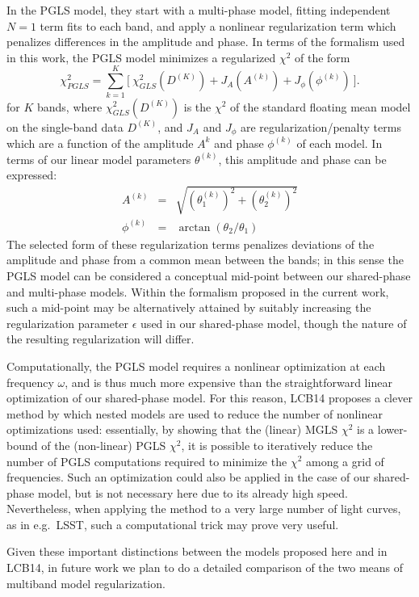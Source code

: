 \documentclass{emulateapj}
\begin{document}
In the PGLS model, they start with a multi-phase model, fitting independent $N=1$ term fits to each band, and apply a nonlinear regularization term which penalizes differences in the amplitude and phase. In terms of the formalism used in this work, the PGLS model minimizes a regularized $\chi^2$ of the form
\begin{equation}
  \chi^2_{PGLS} = \sum_{k=1}^K \bigg[~\chi^2_{GLS}(D^{(K)}) + J_A(A^{(k)}) + J_\phi(\phi^{(k)})~\bigg].
\end{equation}
for $K$ bands, where $\chi^2_{GLS}(D^{(K)})$ is the $\chi^2$ of the standard floating mean model on the single-band data $D^{(K)}$, and $J_A$ and $J_\phi$ are regularization/penalty terms which are a function of the amplitude $A^{k}$ and phase $\phi^{(k)}$ of each model. In terms of our linear model parameters $\theta^{(k)}$, this amplitude and phase can be expressed:
\begin{eqnarray}
 A^{(k)} &=& \sqrt{(\theta_1^{(k)})^2 + (\theta_2^{(k)})^2}\nonumber\\
 \phi^{(k)} &=& \arctan(\theta_2 / \theta_1)
\end{eqnarray}
The selected form of these regularization terms penalizes deviations of the amplitude and phase from a common mean between the bands; in this sense the PGLS model can be considered a conceptual mid-point between our shared-phase and multi-phase models.
Within the formalism proposed in the current work, such a mid-point may be alternatively attained by suitably increasing the regularization parameter $\epsilon$ used in our shared-phase model, though the nature of the resulting regularization will differ.

Computationally, the PGLS model requires a nonlinear optimization at each frequency $\omega$, and is thus much more expensive than the straightforward linear optimization of our shared-phase model.
For this reason, LCB14 proposes a clever method by which nested models are used to reduce the number of nonlinear optimizations used: essentially, by showing that the (linear) MGLS $\chi^2$ is a lower-bound of the (non-linear) PGLS $\chi^2$, it is possible to iteratively reduce the number of PGLS computations required to minimize the $\chi^2$ among a grid of frequencies.
Such an optimization could also be applied in the case of our shared-phase model, but is not necessary here due to its already high speed.
Nevertheless, when applying the method to a very large number of light curves, as in e.g.~LSST, such a computational trick may prove very useful.

Given these important distinctions between the models proposed here and in LCB14, in future work we plan to do a detailed comparison of the two means of multiband model regularization.
\end{document}
